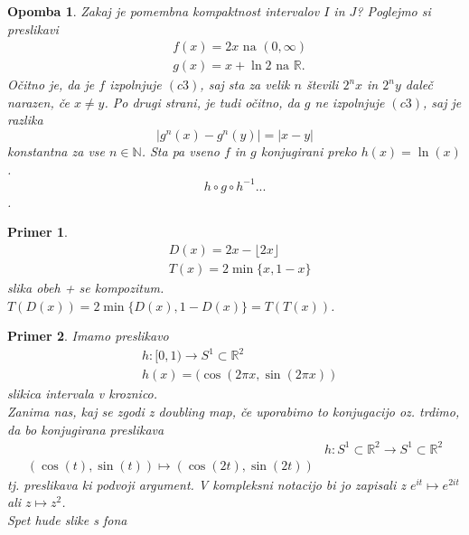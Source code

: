 \documentclass{article}
\newtheorem{opomba}{Opomba}
\newtheorem{primer}{Primer}
\newcommand{\N}{\mathbb{N}}
\newcommand{\R}{\mathbb{R}}
\begin{document}
\begin{opomba}
Zakaj je pomembna kompaktnost intervalov $I$ in $J$? Poglejmo si preslikavi 
\begin{align*}
&f(x) = 2x \text{ na } (0, \infty) \\ 
&g(x) = x + \ln 2 \text{ na } \R.
\end{align*}
Očitno je, da je $f$ izpolnjuje $(c3)$, saj sta za velik $n$ števili $2^n x$ in $2^n y$ daleč narazen, če $x\neq y$. Po drugi strani, je tudi očitno, da $g$ ne izpolnjuje $(c3)$, saj je razlika 
$$
|g^n(x) - g^n(y)| = |x-y|
$$
konstantna za vse $n\in \N$. Sta pa vseno $f$ in $g$ konjugirani preko $h(x) = \ln(x)$.
$$
h\circ g\circ h^{-1} ...
$$.
\end{opomba}

\begin{primer}
\begin{align*}
&D(x) = 2x - \lfloor 2x \rfloor \\ 
&T(x) = 2\min\{x, 1-x\}
\end{align*}
slika obeh + se kompozitum.
$T(D(x)) = 2\min\{D(x), 1 - D(x)\} = T(T(x))$.
\end{primer}

\begin{primer}
Imamo preslikavo
\begin{align*}
&h: [0, 1) \rightarrow S^1 \subset \R^2 \\ 
&h(x) = (\cos(2\pi x, \sin(2\pi x))
\end{align*}
slikica intervala v kroznico.\\ 
Zanima nas, kaj se zgodi z doubling map, če uporabimo to konjugacijo oz. trdimo, da bo konjugirana preslikava 
\begin{align*}
&h: S^1 \subset \R^2 \rightarrow S^1 \subset \R^2 \\ 
(\cos(t), \sin(t)) \mapsto (\cos(2t), \sin(2t))
\end{align*}
tj. preslikava ki podvoji argument. V kompleksni notacijo bi jo zapisali z $e^{it} \mapsto e^{2it}$ ali $z \mapsto z^2$. \\ 
Spet hude slike s fona\\ 
\end{primer}
\end{document}
